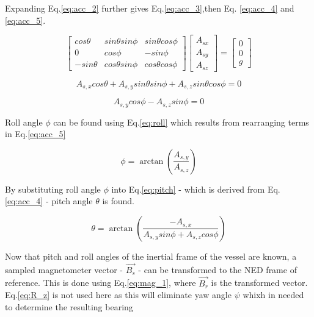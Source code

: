 Expanding Eq.\ref{eq:acc_2} further gives Eq.\ref{eq:acc_3},then Eq. \ref{eq:acc_4} and \ref{eq:acc_5}.

\begin{equation}
    \label{eq:acc_3}
    \begin{bmatrix} cos\theta & sin\theta sin\phi & sin\theta cos\phi \\ 0 & cos\phi & -sin\phi \\ -sin\theta & cos\theta sin\phi & cos\theta cos\phi \end{bmatrix} \begin{bmatrix} A_{sx} \\ A_{sy} \\ A_{sz} \end{bmatrix}= \begin{bmatrix} 0 \\ 0 \\ g \end{bmatrix}
\end{equation}

\begin{equation}
    \label{eq:acc_4}
    A_{s,x}cos\theta + A_{s,y}sin\theta sin\phi + A_{s,z}sin\theta cos\phi = 0
\end{equation}

\begin{equation}
    \label{eq:acc_5}
    A_{s,y}cos\phi - A_{s,z}sin\phi = 0
\end{equation}

Roll angle $\phi$ can be found using Eq.\ref{eq:roll} which results from rearranging terms in Eq.\ref{eq:acc_5}

\begin{equation}
    \label{eq:roll}
    \phi = \arctan \left(\frac{A_{s,y}}{A_{s,z}}\right)
\end{equation}

By substituting roll angle $\phi$ into Eq.\ref{eq:pitch} - which is derived from Eq.\ref{eq:acc_4} - pitch angle $\theta$ is found.

\begin{equation}
    \label{eq:pitch}
    \theta = \arctan \left( \frac{ -A_{s,x}}{A_{s,y}sin\phi + A_{s,z}cos\phi}\right)
\end{equation}

Now that pitch and roll angles of the inertial frame of the vessel are known, a sampled magnetometer vector - $\vec{B_{s}}$ - can be transformed to the NED frame of reference. This is done
using Eq.\ref{eq:mag_1}, where $\vec{B_{r}}$ is the transformed vector. Eq.\ref{eq:R_z} is not used here as this will eliminate yaw angle $\psi$ whixh in needed to determine the resulting bearing

